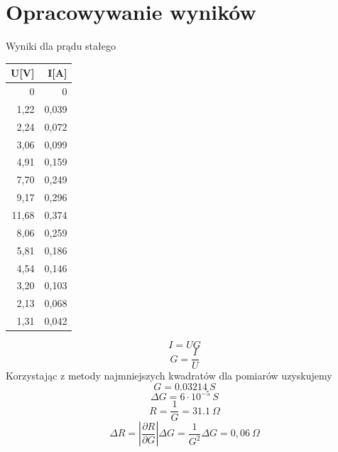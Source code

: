 \documentclass[11pt]{article}
\author{Łukasz Dubiel}
\begin{document}
\section{Opracowywanie wyników}
\begin{multicols}{2}

Wyniki dla prądu stałego
\begin{center}

\begin{tabular}{|r|r|}
\hline
	U[V] & I[A] \\
\hline
	0 & 0\\
	1,22 & 0,039\\
	2,24 & 0,072\\
	3,06 & 0,099\\
	4,91 & 0,159\\
	7,70 & 0,249\\
	9,17 & 0,296\\
	11,68 & 0,374\\
	8,06 & 0,259\\
	5,81 & 0,186\\
	4,54 & 0,146\\
	3,20 & 0,103\\
	2,13 & 0,068\\
	1,31 & 0,042\\
\hline
\end{tabular}
\end{center}

$$ I = U G $$
$$ G = \frac{I}{U} $$
Korzystając z metody najmniejszych kwadratów dla pomiarów uzyskujemy 
$$ G = 0.03214\ S $$
$$ \Delta G = 6 \cdot 10^{-5}\ S $$
$$ R = \frac{1}{G} = 31.1\ \Omega $$
$$ \Delta R = \left| \frac{\partial R}{\partial G} \right| \Delta G = \frac{1}{G^2} \Delta G = 0,06\  \Omega $$

\end{multicols}
\end{document}
